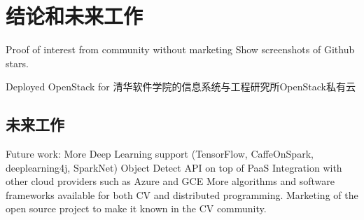 \chapter{结论和未来工作}

Proof of interest from community without marketing
Show screenshots of Github stars. 

Deployed OpenStack for 清华软件学院的信息系统与工程研究所OpenStack私有云


\section{未来工作}

Future work:
More Deep Learning support (TensorFlow, CaffeOnSpark, deeplearning4j, SparkNet)
Object Detect API on top of PaaS
Integration with other cloud providers such as Azure and GCE
More algorithms and software frameworks available for both CV and distributed programming.
Marketing of the open source project to make it known in the CV community.
